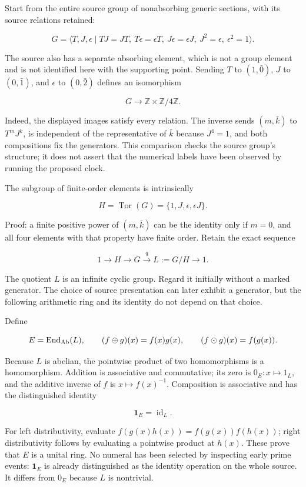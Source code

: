 \documentclass[
]{article}
\begin{document}
Start from the entire source group of nonabsorbing generic sections,
with its source relations retained:

\[
G=\langle T,J,\epsilon\mid TJ=JT,\ T\epsilon=\epsilon T,
\ J\epsilon=\epsilon J,\ J^2=\epsilon,\ \epsilon^2=1\rangle.
\]

The source also has a separate absorbing element, which is not a group
element and is not identified here with the supporting point. Sending
\(T\) to \((1,\bar0)\), \(J\) to \((0,\bar1)\), and \(\epsilon\) to
\((0,\bar2)\) defines an isomorphism

\[
G\longrightarrow\mathbb Z\times\mathbb Z/4\mathbb Z.
\]

Indeed, the displayed images satisfy every relation. The inverse sends
\((m,\bar k)\) to \(T^mJ^k\), is independent of the representative of
\(\bar k\) because \(J^4=1\), and both compositions fix the generators.
This comparison checks the source group's structure; it does not assert
that the numerical labels have been observed by running the proposed
clock.

The subgroup of finite-order elements is intrinsically

\[
H=\operatorname{Tor}(G)=\{1,J,\epsilon,\epsilon J\}.
\]

Proof: a finite positive power of \((m,\bar k)\) can be the identity
only if \(m=0\), and all four elements with that property have finite
order. Retain the exact sequence

\[
1\longrightarrow H\longrightarrow G\xrightarrow{q}L:=G/H\longrightarrow1.
\]

The quotient \(L\) is an infinite cyclic group. Regard it initially
without a marked generator. The choice of source presentation can later
exhibit a generator, but the following arithmetic ring and its identity
do not depend on that choice.

Define

\[
E=\operatorname{End}_{\rm Ab}(L),
\qquad
(f\oplus g)(x)=f(x)g(x),
\qquad
(f\odot g)(x)=f(g(x)).
\]

Because \(L\) is abelian, the pointwise product of two homomorphisms is
a homomorphism. Addition is associative and commutative; its zero is
\(0_E:x\mapsto1_L\), and the additive inverse of \(f\) is
\(x\mapsto f(x)^{-1}\). Composition is associative and has the
distinguished identity

\[
\mathbf1_E=\operatorname{id}_L.
\]

For left distributivity, evaluate \(f(g(x)h(x))=f(g(x))f(h(x))\); right
distributivity follows by evaluating a pointwise product at \(h(x)\).
These prove that \(E\) is a unital ring. No numeral has been selected by
inspecting early prime events: \(\mathbf1_E\) is already distinguished
as the identity operation on the whole source. It differs from \(0_E\)
because \(L\) is nontrivial.
\end{document}
